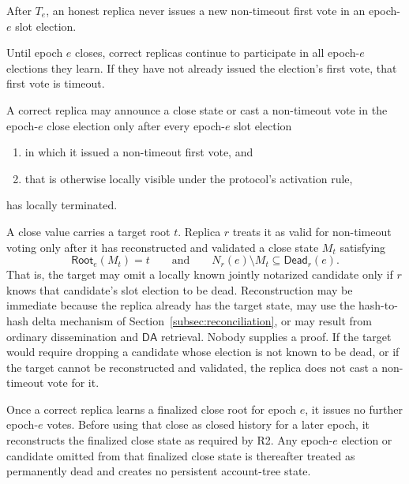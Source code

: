 \documentclass[11pt]{article}
\theoremstyle{remark}
\newcommand{\Dead}{\mathsf{Dead}}
\newcommand{\Root}{\mathsf{Root}}
\newcommand{\DA}{\mathsf{DA}}
\begin{document}
\begin{description}[leftmargin=2.4em,labelindent=0em]
\item[D1 (non-timeout cutoff).]
After $T_e$, an honest replica never issues a new non-timeout first vote in an epoch-$e$ slot election.

\item[D2 (continued drain participation).]
Until epoch $e$ closes, correct replicas continue to participate in all epoch-$e$ elections they learn. If they have not already issued the election's first vote, that first vote is timeout.

\item[D3 (close readiness).]
A correct replica may announce a close state or cast a non-timeout vote in the epoch-$e$ close election only after every epoch-$e$ slot election
\begin{enumerate}[label=(\alph*),nosep]
  \item in which it issued a non-timeout first vote, and
  \item that is otherwise locally visible under the protocol's activation rule,
\end{enumerate}
has locally terminated.

\item[D4 (target validity with dead-election omission).]
A close value carries a target root $t$. Replica $r$ treats it as valid for non-timeout voting only after it has reconstructed and validated a close state $M_t$ satisfying
\begin{equation}
  \Root_e(M_t)=t
  \qquad\text{and}\qquad
  N_r(e)\setminus M_t \subseteq \Dead_r(e).
  \label{eq:d4}
\end{equation}
That is, the target may omit a locally known jointly notarized candidate only if $r$ knows that candidate's slot election to be dead. Reconstruction may be immediate because the replica already has the target state, may use the hash-to-hash delta mechanism of Section~\ref{subsec:reconciliation}, or may result from ordinary dissemination and $\DA$ retrieval. Nobody supplies a proof. If the target would require dropping a candidate whose election is not known to be dead, or if the target cannot be reconstructed and validated, the replica does not cast a non-timeout vote for it.

\item[D5 (post-close fence).]
Once a correct replica learns a finalized close root for epoch $e$, it issues no further epoch-$e$ votes. Before using that close as closed history for a later epoch, it reconstructs the finalized close state as required by R2. Any epoch-$e$ election or candidate omitted from that finalized close state is thereafter treated as permanently dead and creates no persistent account-tree state.
\end{description}
\end{document}
